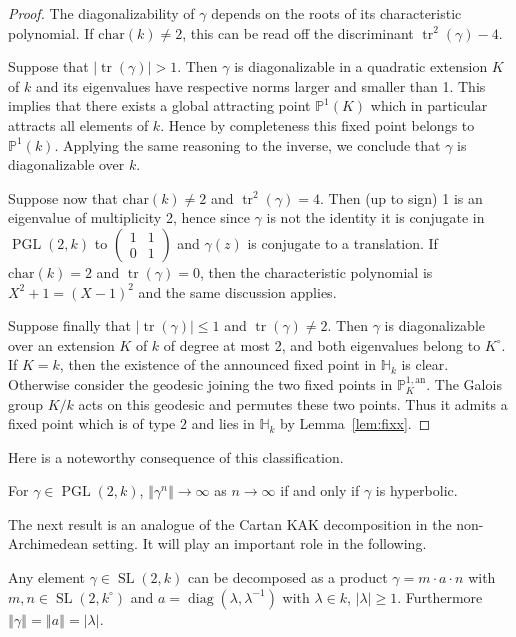 \documentclass[10pt]{amsart}
\theoremstyle{definition}\newtheorem{defi}[theo]{Definition}\newtheorem{rema}[theo]{Remark}\newtheorem{exam}[theo]{Example}\newtheorem{exem}[theo]{Example}\newtheorem{nota}[theo]{Notation}
\DeclareMathOperator{\tr}{tr}
\DeclareMathOperator{\SL}{SL}
\DeclareMathOperator{\PGL}{PGL}
\DeclareMathOperator{\diag}{diag}
\newcommand{\hh}{\mathbb{H}}
\newcommand{\an}{\mathrm{an}}
\newcommand{\cv}{\rightarrow}
\newcommand{\norm}[1]{\left\Vert#1\right\Vert}
\newcommand{\abs}[1]{\left\vert#1\right\vert}
\newcommand{\pu}{{\mathbb{P}^1}}
\newcommand{\PP}{\mathbb{P}}
\newcommand{\lrpar}[1]{\left(#1\right)}
\newcommand{\PGLk}{\PGL(2, k)}
\begin{document}
\begin{proof}
The diagonalizability of $\gamma$ depends on the roots of its characteristic polynomial.
If $\mathrm{char}(k)\neq 2$, this can be read off the discriminant $\tr^2(\gamma)-4$.

Suppose that $\mathopen|\tr(\gamma)\mathclose| >1$. Then $\gamma$ is diagonalizable in a quadratic extension $K$ of $k$ and its eigenvalues have respective norms larger and smaller than 1. This implies that there exists a global attracting point $\PP^1(K)$ which in particular attracts all elements of $k$. Hence by completeness this fixed point belongs to $\pu(k)$. Applying the same reasoning to the inverse, we conclude that $\gamma$ is diagonalizable over $k$.


Suppose now that $\mathrm{char}(k)\neq 2$ and $\tr^2(\gamma) =4$. Then (up to sign) 1 is an eigenvalue of multiplicity 2, hence since $\gamma$ is not the identity it is conjugate in $\PGLk$ to $\lrpar{
\begin{smallmatrix} 1& 1 \\ 0& 1
\end{smallmatrix}}$ and $\gamma(z)$ is conjugate to a translation.
If $\mathrm{char}(k)=2$ and $\tr(\gamma) = 0$, then the characteristic polynomial is $X^2+1 = (X-1)^2$ and the same discussion applies.

Suppose finally that $\mathopen|\tr(\gamma)\mathclose|\leq 1$ and $\tr(\gamma) \neq 2$. Then $\gamma$ is diagonalizable over an extension $K$ of $k$ of degree at most 2, and both eigenvalues belong to $K^\circ$. If $K=k$, then the existence of the announced fixed point in $\hh_k$ is clear. Otherwise consider the geodesic joining the two fixed points in $\PP^{1,\an}_K$. The Galois group $K/k$ acts on this geodesic and permutes these two points. Thus it admits a fixed point which is of type $2$ and lies in $\hh_k$ by Lemma~\ref{lem:fixx}.
\end{proof}

Here is a noteworthy consequence of this classification.

\begin{coro}
For $\gamma\in \PGLk$, $\norm{\gamma^n} \to \infty$ as $n\cv\infty$ if and only if $\gamma$ is hyperbolic.
\end{coro}

The next result is an analogue of the Cartan KAK decomposition in the non-Archimedean setting. It will play an important role in the following.

\begin{prop}\label{prop:KAK}
Any element $\gamma\in \SL(2,k)$ can be decomposed as a product $\gamma= m\cdot a \cdot n$ with $m,n \in \SL(2,k^\circ)$ and $a = \diag (\lambda, \lambda^{-1})$ with $\lambda\in k$, $|\lambda|\ge 1$. Furthermore $\norm{\gamma} = \norm{a} = \abs{\lambda}$.
\end{prop}
\end{document}
